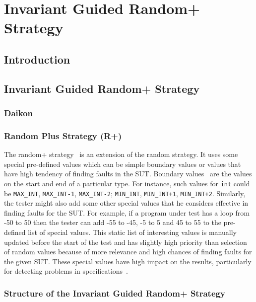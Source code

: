 \chapter{Invariant Guided Random+ Strategy}
\label{chap:IGRS}

\section{Introduction}\label{sec:intro6}

\section{Invariant Guided Random+ Strategy}\label{sec:igrs}

\subsection{Daikon}

\subsection{Random Plus Strategy (R+)}
The random+ strategy~\cite{Leitner2007} is an extension of the random strategy. It uses some special pre-defined values which can be simple boundary values or values that have high tendency of finding faults in the SUT. Boundary values~\cite{Beizer1990} are the values on the start and end of a particular type. For instance, such values for \verb+int+ could be \verb+MAX_INT+, \verb+MAX_INT-1+, \verb+MAX_INT-2+; \verb+MIN_INT+, \verb-MIN_INT+1-, \verb-MIN_INT+2-. Similarly, the tester might also add some other special values that he considers effective in finding faults for the SUT. For example, if a program under test has a loop from -50 to 50 then the tester can add -55 to -45, -5 to 5 and 45 to 55 to the pre-defined list of special values. This static list of interesting values is manually updated before the start of the test and has slightly high priority than selection of random values because of more relevance and high chances of finding faults for the given SUT. These special values have high impact on the results, particularly for detecting problems in specifications~\cite{Ciupa2008}.


\subsection{Structure of the Invariant Guided Random+ Strategy}

